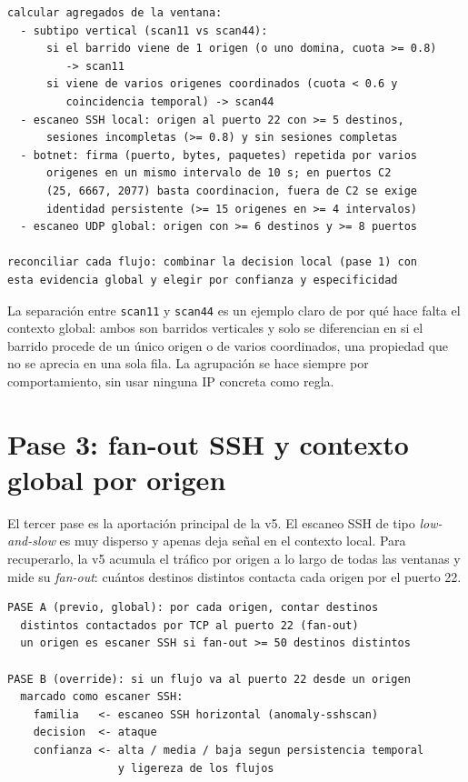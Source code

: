 \begin{small}
\begin{verbatim}
calcular agregados de la ventana:
  - subtipo vertical (scan11 vs scan44):
      si el barrido viene de 1 origen (o uno domina, cuota >= 0.8)
         -> scan11
      si viene de varios origenes coordinados (cuota < 0.6 y
         coincidencia temporal) -> scan44
  - escaneo SSH local: origen al puerto 22 con >= 5 destinos,
      sesiones incompletas (>= 0.8) y sin sesiones completas
  - botnet: firma (puerto, bytes, paquetes) repetida por varios
      origenes en un mismo intervalo de 10 s; en puertos C2
      (25, 6667, 2077) basta coordinacion, fuera de C2 se exige
      identidad persistente (>= 15 origenes en >= 4 intervalos)
  - escaneo UDP global: origen con >= 6 destinos y >= 8 puertos

reconciliar cada flujo: combinar la decision local (pase 1) con
esta evidencia global y elegir por confianza y especificidad
\end{verbatim}
\end{small}

La separación entre \texttt{scan11} y \texttt{scan44} es un ejemplo claro de por qué hace falta el contexto global: ambos son barridos verticales y solo se diferencian en si el barrido procede de un único origen o de varios coordinados, una propiedad que no se aprecia en una sola fila. La agrupación se hace siempre por comportamiento, sin usar ninguna IP concreta como regla.

\section{Pase 3: fan-out SSH y contexto global por origen}
\label{sec:apd_pase3}

El tercer pase es la aportación principal de la v5. El escaneo SSH de tipo \emph{low-and-slow} es muy disperso y apenas deja señal en el contexto local. Para recuperarlo, la v5 acumula el tráfico por origen a lo largo de todas las ventanas y mide su \emph{fan-out}: cuántos destinos distintos contacta cada origen por el puerto 22.

\begin{small}
\begin{verbatim}
PASE A (previo, global): por cada origen, contar destinos
  distintos contactados por TCP al puerto 22 (fan-out)
  un origen es escaner SSH si fan-out >= 50 destinos distintos

PASE B (override): si un flujo va al puerto 22 desde un origen
  marcado como escaner SSH:
    familia   <- escaneo SSH horizontal (anomaly-sshscan)
    decision  <- ataque
    confianza <- alta / media / baja segun persistencia temporal
                 y ligereza de los flujos
\end{verbatim}
\end{small}

